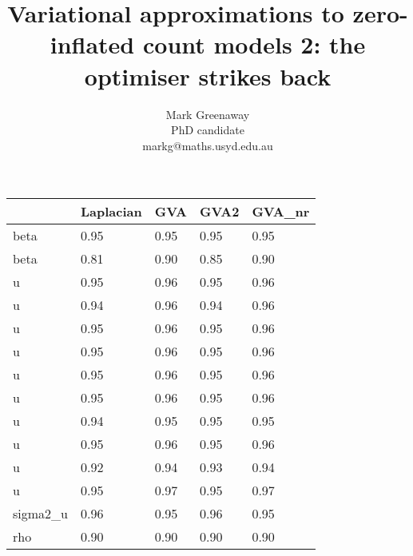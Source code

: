 \documentclass{beamer}
\title{Variational approximations to zero-inflated count models 2: the optimiser strikes back}
\author{Mark Greenaway\\PhD candidate\\markg@maths.usyd.edu.au}
\begin{document}
\begin{frame}
\titlepage
\end{frame}






\begin{frame}
\begin{tabular}{lllll}
\hline
	& Laplacian & GVA & GVA2 & GVA_nr \\
\hline
beta&0.95&0.95&0.95&0.95 \\
beta&0.81&0.90&0.85&0.90 \\
u&0.95&0.96&0.95&0.96 \\
u&0.94&0.96&0.94&0.96 \\
u&0.95&0.96&0.95&0.96 \\
u&0.95&0.96&0.95&0.96 \\
u&0.95&0.96&0.95&0.96 \\
u&0.95&0.96&0.95&0.96 \\
u&0.94&0.95&0.95&0.95 \\
u&0.95&0.96&0.95&0.96 \\
u&0.92&0.94&0.93&0.94 \\
u&0.95&0.97&0.95&0.97 \\
sigma2_u&0.96&0.95&0.96&0.95 \\
rho&0.90&0.90&0.90&0.90 \\
\hline
\end{tabular}
\end{frame}

\end{document}
